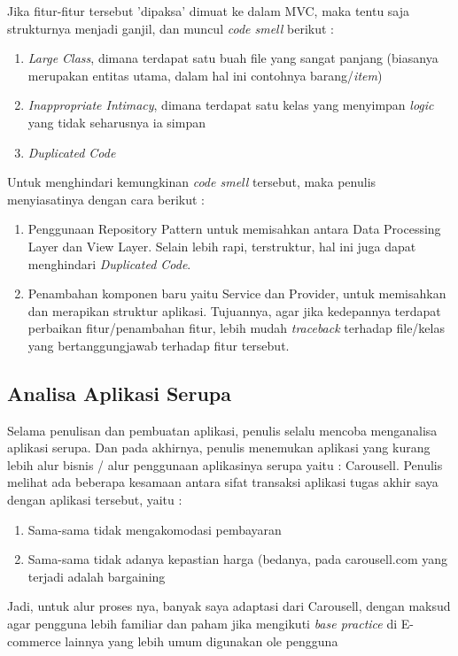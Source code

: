    Jika fitur-fitur tersebut 'dipaksa' dimuat ke dalam MVC, maka tentu saja strukturnya menjadi ganjil, dan muncul \textit{code smell} berikut :
    \begin{enumerate}
    \item \textit{Large Class}, dimana terdapat satu buah file yang sangat panjang (biasanya merupakan entitas utama, dalam hal ini contohnya barang/\textit{item})
    \item \textit{Inappropriate Intimacy}, dimana terdapat satu kelas yang menyimpan \textit{logic} yang tidak seharusnya ia simpan
    \item \textit{Duplicated Code}
    \end{enumerate}
    
    Untuk menghindari kemungkinan \textit{code smell} tersebut, maka penulis menyiasatinya dengan cara berikut :
    \begin{enumerate}
    \item Penggunaan Repository Pattern untuk memisahkan antara Data Processing Layer dan View Layer.
    Selain lebih rapi, terstruktur, hal ini juga dapat menghindari \textit{Duplicated Code}.
    \item Penambahan komponen baru yaitu Service dan Provider, untuk memisahkan dan merapikan struktur aplikasi.
    Tujuannya, agar jika kedepannya terdapat perbaikan fitur/penambahan fitur, lebih mudah \textit{traceback} terhadap file/kelas yang bertanggungjawab terhadap fitur tersebut.
	\end{enumerate}
    
    \subsection{Analisa Aplikasi Serupa}
    \label{alasan-app-serupa}
    Selama penulisan dan pembuatan aplikasi, penulis selalu mencoba menganalisa aplikasi serupa. Dan pada akhirnya, penulis menemukan aplikasi yang kurang lebih alur bisnis / alur penggunaan aplikasinya serupa yaitu : Carousell.
	Penulis melihat ada beberapa kesamaan antara sifat transaksi aplikasi tugas akhir saya dengan aplikasi tersebut, yaitu :
	\begin{enumerate}
	\item Sama-sama tidak mengakomodasi pembayaran
    \item Sama-sama tidak adanya kepastian harga (bedanya, pada carousell.com yang terjadi adalah bargaining
	\end{enumerate}
	Jadi, untuk alur proses nya, banyak saya adaptasi dari Carousell, dengan maksud agar pengguna lebih familiar dan paham jika mengikuti \textit{base practice} di E-commerce lainnya yang lebih umum digunakan ole pengguna